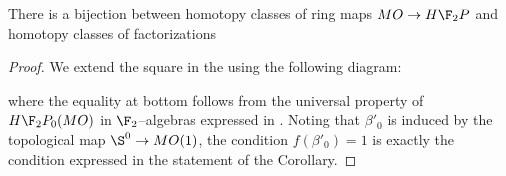 \begin{corollary}\label{MOOrientationsVsRPClasses}
There is a bijection between homotopy classes of ring maps $MO \to H\F_2P$ and homotopy classes of factorizations
\begin{center}
\end{center}
\end{corollary}
\begin{proof}
We extend the square in the  using the following diagram:
\begin{center}
\end{center}
where the equality at bottom follows from the universal property of $H\F_2P_0(MO)$ in $\F_2$--algebras expressed in .  Noting that $\beta'_0$ is induced by the topological map $\S^0 \to MO(1)$, the condition $f(\beta'_0) = 1$ is exactly the condition expressed in the statement of the Corollary.
\end{proof}

